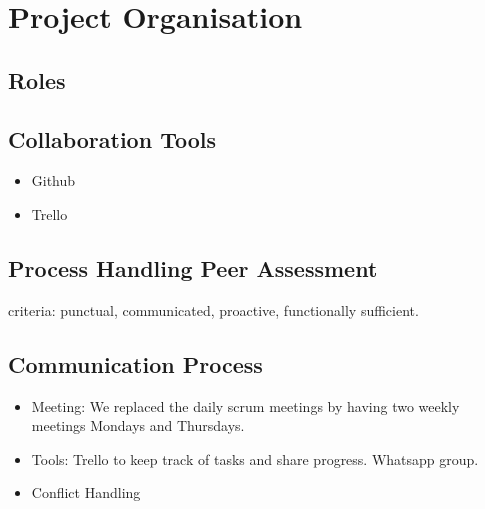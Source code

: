 \documentclass[11pt]{article}
\begin{document}
\section{Project Organisation}
\subsection{Roles}
\subsection{Collaboration Tools}
\begin{itemize}
	\item Github
	\item Trello
\end{itemize}
\subsection{Process Handling Peer Assessment}
criteria: punctual, communicated, proactive, functionally sufficient. 
\subsection{Communication Process}
\begin{itemize}
	\item Meeting: We replaced the daily scrum meetings by having two weekly meetings Mondays and Thursdays.
	\item Tools: Trello to keep track of tasks and share progress. Whatsapp group.
	\item Conflict Handling
\end{itemize}
\end{document}
